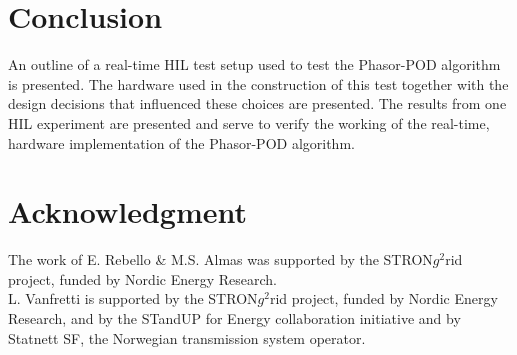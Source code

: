 \documentclass[conference]{IEEEtran}
\begin{document}
\section{Conclusion} \label{conclusion}
An outline of a real-time HIL test setup used to test the Phasor-POD algorithm is presented. The hardware used in the construction of this test together with the design decisions that influenced these choices are presented. The results from one HIL experiment are presented and serve to verify the working of the real-time, hardware implementation of the Phasor-POD algorithm.


\section*{Acknowledgment}
The work of E. Rebello \& M.S. Almas was supported by the STRON$g^{2}$rid project, funded by Nordic Energy Research.\\
L. Vanfretti is supported by the STRON$g^{2}$rid project, funded by Nordic Energy Research, and by the STandUP for Energy collaboration initiative and by Statnett SF, the Norwegian transmission system operator.

%
%
%
\end{document}
